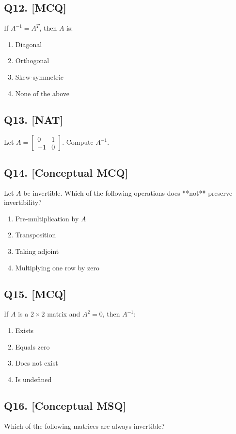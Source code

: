 \subsection*{Q12. [MCQ]}
If $A^{-1} = A^T$, then $A$ is:

\begin{enumerate}[label=(\alph*)]
    \item Diagonal
    \item Orthogonal
    \item Skew-symmetric
    \item None of the above
\end{enumerate}

\subsection*{Q13. [NAT]}
Let $A = \begin{bmatrix} 0 & 1 \\ -1 & 0 \end{bmatrix}$. Compute $A^{-1}$.

\subsection*{Q14. [Conceptual MCQ]}
Let $A$ be invertible. Which of the following operations does **not** preserve invertibility?

\begin{enumerate}[label=(\alph*)]
    \item Pre-multiplication by $A$
    \item Transposition
    \item Taking adjoint
    \item Multiplying one row by zero
\end{enumerate}

\subsection*{Q15. [MCQ]}
If $A$ is a $2 \times 2$ matrix and $A^2 = 0$, then $A^{-1}$:

\begin{enumerate}[label=(\alph*)]
    \item Exists
    \item Equals zero
    \item Does not exist
    \item Is undefined
\end{enumerate}

\subsection*{Q16. [Conceptual MSQ]}
Which of the following matrices are always invertible?

